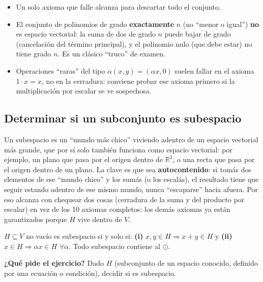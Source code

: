 \documentclass[11pt,a4paper]{article}
\newcommand{\qpide}[1]{\textbf{¿Qué pide el ejercicio?} #1\par}
\begin{document}
\begin{atencion}
\begin{itemize}
    \item Un solo axioma que falle alcanza para descartar todo el conjunto.
    \item El conjunto de polinomios de grado \textbf{exactamente} $n$ (no ``menor o igual'')
    \textbf{no} es espacio vectorial: la suma de dos de grado $n$ puede bajar de grado
    (cancelación del término principal), y el polinomio nulo (que debe estar) no tiene
    grado $n$. Es un clásico ``truco'' de examen.
    \item Operaciones ``raras'' del tipo $\alpha(x,y)=(\alpha x,0)$ suelen fallar en el
    axioma $1\cdot x=x$, no en la cerradura: conviene probar ese axioma primero si la
    multiplicación por escalar se ve sospechosa.
\end{itemize}
\end{atencion}

\subsection{Determinar si un subconjunto es subespacio}

\begin{intuicion}
Un subespacio es un ``mundo más chico'' viviendo adentro de un espacio vectorial más
grande, que por sí solo también funciona como espacio vectorial: por ejemplo, un plano
que pasa por el origen dentro de $\mathbb R^3$, o una recta que pasa por el origen dentro
de un plano. La clave es que sea \textbf{autocontenido}: si tomás dos elementos de ese
``mundo chico'' y los sumás (o los escalás), el resultado tiene que seguir estando adentro
de ese mismo mundo, nunca ``escaparse'' hacia afuera. Por eso alcanza con chequear dos
cosas (cerradura de la suma y del producto por escalar) en vez de los 10 axiomas
completos: los demás axiomas ya están garantizados porque $H$ vive dentro de $V$.
\end{intuicion}

\begin{teoria}[Teorema 1.1.4]
$H\subseteq V$ no vacío es subespacio si y solo si:
\textbf{(i)} $x,y\in H\Rightarrow x+y\in H$ y \textbf{(ii)} $x\in H\Rightarrow \alpha x\in H$
$\forall\alpha$. Todo subespacio contiene al $\odot$.
\end{teoria}

\qpide{Dado $H$ (subconjunto de un espacio conocido, definido por una ecuación o
condición), decidir si es subespacio.}
\end{document}
